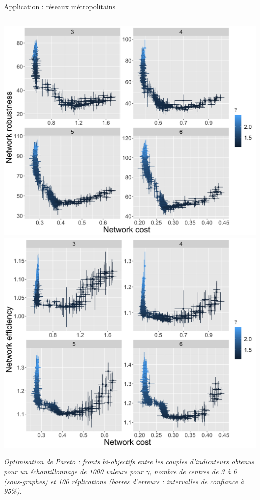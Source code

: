 \documentclass{beamer}
\begin{document}
\begin{frame}{}
\begin{columns}[t]
\begin{column}{.49\textwidth}
\begin{block}{Application : réseaux métropolitains}
\begin{columns}[t]
\begin{column}{.95\textwidth}
\begin{justify}
          {
          \centering
          \includegraphics[width=0.5\columnwidth]{figures/pareto_cost-robustness_facetCenterNumber_withgaussianCI.png}
          \includegraphics[width=0.5\columnwidth]{figures/pareto_cost-speed_facetCenterNumber_withgaussianCI.png}\\
         
         \bigskip
          
          \small
          \textit{Optimisation de Pareto : fronts bi-objectifs entre les couples d'indicateurs obtenus pour un échantillonnage de 1000 valeurs pour $\gamma$, nombre de centres de 3 à 6 (sous-graphes) et 100 réplications (barres d'erreurs : intervalles de confiance à 95\%).}
         }
          
          \end{justify}
          \end{column}
          \end{columns}
        \end{block}


%          
        

\end{column}
\end{columns}
\end{frame}
\end{document}
